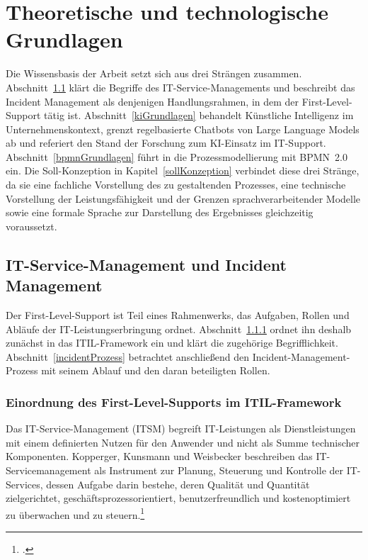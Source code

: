\section{Theoretische und technologische Grundlagen}

Die Wissensbasis der Arbeit setzt sich aus drei Str\"angen zusammen. Abschnitt~\ref{itsm} kl\"art die Begriffe des IT-Service-Managements und beschreibt das Incident Management als denjenigen Handlungsrahmen, in dem der First-Level-Support t\"atig ist. Abschnitt~\ref{kiGrundlagen} behandelt K\"unstliche Intelligenz im Unternehmenskontext, grenzt regelbasierte Chatbots von Large Language Models ab und referiert den Stand der Forschung zum KI-Einsatz im IT-Support. Abschnitt~\ref{bpmnGrundlagen} f\"uhrt in die Prozessmodellierung mit BPMN~2.0 ein. Die Soll-Konzeption in Kapitel~\ref{sollKonzeption} verbindet diese drei Str\"ange, da sie eine fachliche Vorstellung des zu gestaltenden Prozesses, eine technische Vorstellung der Leistungsf\"ahigkeit und der Grenzen sprachverarbeitender Modelle sowie eine formale Sprache zur Darstellung des Ergebnisses gleichzeitig voraussetzt.

\subsection{IT-Service-Management und Incident Management}
\label{itsm}

Der First-Level-Support ist Teil eines Rahmenwerks, das Aufgaben, Rollen und Abl\"aufe der IT-Leistungserbringung ordnet. Abschnitt~\ref{itilEinordnung} ordnet ihn deshalb zun\"achst in das ITIL-Framework ein und kl\"art die zugeh\"orige Begrifflichkeit. Abschnitt~\ref{incidentProzess} betrachtet anschlie{\ss}end den Incident-Management-Prozess mit seinem Ablauf und den daran beteiligten Rollen.

\subsubsection{Einordnung des First-Level-Supports im ITIL-Framework}
\label{itilEinordnung}

Das IT-Service-Management (ITSM) begreift IT-Leistungen als Dienstleistungen mit einem definierten Nutzen f\"ur den Anwender und nicht als Summe technischer Komponenten. Kopperger, Kunsmann und Weisbecker beschreiben das IT-Servicemanagement als Instrument zur Planung, Steuerung und Kontrolle der IT-Services, dessen Aufgabe darin bestehe, deren Qualit\"at und Quantit\"at zielgerichtet, gesch\"aftsprozessorientiert, benutzerfreundlich und kostenoptimiert zu \"uberwachen und zu steuern.\footcite[Vgl.][hier S.~422]{Tiemeyer2020}

